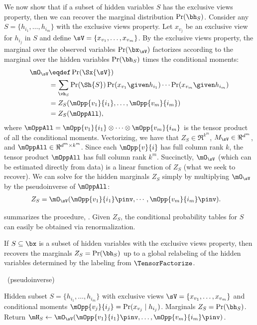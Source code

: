 We now show that if a subset of hidden variables $S$ has the exclusive views property,
then we can recover the marginal distribution $\Pr(\bh_S)$.
Consider any $S = \{h_{i_1}, \ldots, h_{i_m}\}$ with the exclusive views property. Let
  $x_{v_j}$ be an exclusive view for $h_{i_j}$ in $S$ and define $\sV
  = \{x_{v_1}, \ldots, x_{v_m}\}$. %
By the exclusive views property,
the marginal over the observed variables $\Pr(\bx_\sV)$
factorizes according to the marginal over the hidden variables $\Pr(\bh_S)$
times the conditional moments:
\begin{align*}
  \mO_\sV 
  &\eqdef \Pr(\Sx{\sV}) \\
  &= \sum_{\vh_S} \Pr(\Sh{S}) 
                    \Pr(x_{v_1} \given h_{i_1}) \cdots \Pr(x_{v_m} \given h_{i_m}) \\
  &= Z_{S}(\mOpp{v_1}{i_1},\dots,\mOpp{v_m}{i_m}) \\
  &= Z_{S}(\mOppAll),
\end{align*}
where $\mOppAll = \mOpp{v_1}{i_1} \otimes \cdots \otimes \mOpp{v_m}{i_m}$ is the tensor product of
all the conditional moments.
Vectorizing, we have that
$Z_S \in \Re^{k^m}$,
$M_\sV \in \Re^{d^m}$,
and $\mOppAll \in \Re^{d^m \times k^m}$.
Since each $\mOpp{v}{i}$ has full column rank $k$,
the tensor product $\mOppAll$ has full column rank $k^m$.
Succinctly, $\mO_\sV$ (which can be estimated directly from data)
is a linear function of $Z_S$ (what we seek to recover).
We can solve for the hidden marginals $Z_S$ simply by multiplying $\mO_\sV$ by the pseudoinverse of
$\mOppAll$:
\begin{align*}
  Z_{S} &= \mO_\sV(\mOpp{v_1}{i_1}\pinv,\cdots,\mOpp{v_m}{i_m}\pinv).
\end{align*}

 summarizes the procedure, \LearnMarginals.
Given $Z_S$, the conditional probability tables for $S$ can easily be
obtained via renormalization.
\begin{theorem}
If $S \subseteq \bx$ is a subset of hidden variables with the exclusive views property,
then  recovers the marginals $Z_S
= \Pr(\bh_S)$ up to a global relabeling of the hidden variables
determined by the labeling from $\TensorFactorize$.
\end{theorem}

\begin{algorithm}
  \caption{\LearnMarginals~(pseudoinverse)}
  \label{algo:learnMarginals}
  \begin{algorithmic}
    \REQUIRE Hidden subset $S = \{ h_{i_1}, \dots, h_{i_m} \}$ with exclusive views $\sV = \{ x_{v_1}, \dots, x_{v_m} \}$
    and conditional moments $\mOpp{v_j}{i_j} = \Pr(x_{v_j} \mid h_{i_j})$.
    \ENSURE Marginals $Z_S = \Pr(\bh_S)$.
      \STATE Return $\mH_S \gets \mO_{\sV}( \mOpp{v_1}{i_1}\pinv, \dots, {\mOpp{v_m}{i_m}}\pinv )$.
  \end{algorithmic}
\end{algorithm}

